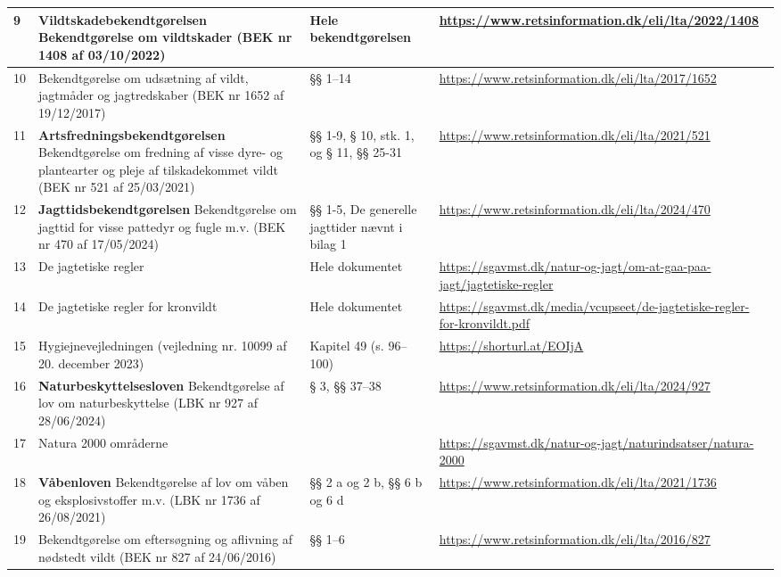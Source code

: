 \documentclass[10pt,a4paper]{article}
\begin{document}
{\begin{tabular}{|P{1.2cm}|P{5.5cm}|P{3.5cm}|P{6.5cm}|}
9 & \textbf{Vildtskadebekendtgørelsen} Bekendtgørelse om vildtskader (BEK nr 1408 af 03/10/2022) & Hele bekendtgørelsen & \url{https://www.retsinformation.dk/eli/lta/2022/1408} \\
\hline

10 & Bekendtgørelse om udsætning af vildt, jagtmåder og jagtredskaber (BEK nr 1652 af 19/12/2017) & §§ 1–14 & \url{https://www.retsinformation.dk/eli/lta/2017/1652} \\
\hline

11 & \textbf{Artsfredningsbekendtgørelsen} Bekendtgørelse om fredning af visse dyre- og plantearter og pleje af tilskadekommet vildt (BEK nr 521 af 25/03/2021) & §§ 1-9, § 10, stk. 1, og § 11, §§ 25-31 & \url{https://www.retsinformation.dk/eli/lta/2021/521} \\
\hline

12 & \textbf{Jagttidsbekendtgørelsen} Bekendtgørelse om jagttid for visse pattedyr og fugle m.v. (BEK nr 470 af 17/05/2024) & §§ 1-5, De generelle jagttider nævnt i bilag 1 & \url{https://www.retsinformation.dk/eli/lta/2024/470} \\
\hline

13 & De jagtetiske regler & Hele dokumentet & \url{https://sgavmst.dk/natur-og-jagt/om-at-gaa-paa-jagt/jagtetiske-regler} \\
\hline

14 & De jagtetiske regler for kronvildt & Hele dokumentet & \url{https://sgavmst.dk/media/vcupseet/de-jagtetiske-regler-for-kronvildt.pdf} \\
\hline

15 & Hygiejnevejledningen (vejledning nr. 10099 af 20. december 2023) & Kapitel 49 (s. 96–100) & \url{https://shorturl.at/EOIjA} \\
\hline

16 & \textbf{Naturbeskyttelsesloven} Bekendtgørelse af lov om naturbeskyttelse (LBK nr 927 af 28/06/2024) & § 3, §§ 37–38  & \url{https://www.retsinformation.dk/eli/lta/2024/927} \\
\hline

17 & Natura 2000 områderne & & \url{https://sgavmst.dk/natur-og-jagt/naturindsatser/natura-2000} \\
\hline

18 & \textbf{Våbenloven} Bekendtgørelse af lov om våben og eksplosivstoffer m.v. (LBK nr 1736 af 26/08/2021) & §§ 2 a og 2 b, §§ 6 b og 6 d & \url{https://www.retsinformation.dk/eli/lta/2021/1736} \\
\hline

19 & Bekendtgørelse om eftersøgning og aflivning af nødstedt vildt (BEK nr 827 af 24/06/2016) & §§ 1–6 & \url{https://www.retsinformation.dk/eli/lta/2016/827} \\
\hline

\end{tabular}
}
\end{document}
